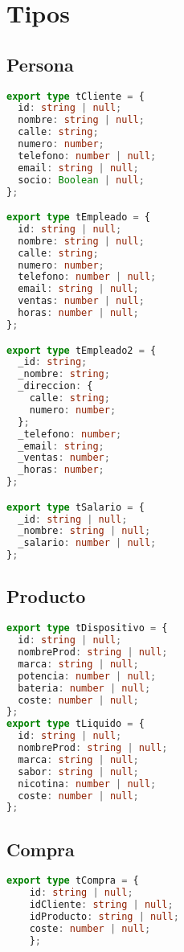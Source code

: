 \documentclass[a4paper]{article} %
\begin{document}
\section{Tipos}
\subsection{Persona}
\begin{lstlisting}[language=Typescript]
export type tCliente = {
  id: string | null;
  nombre: string | null;
  calle: string;
  numero: number;
  telefono: number | null;
  email: string | null;
  socio: Boolean | null;
};

export type tEmpleado = {
  id: string | null;
  nombre: string | null;
  calle: string;
  numero: number;
  telefono: number | null;
  email: string | null;
  ventas: number | null;
  horas: number | null;
};

export type tEmpleado2 = {
  _id: string;
  _nombre: string;
  _direccion: {
    calle: string;
    numero: number;
  };
  _telefono: number;
  _email: string;
  _ventas: number;
  _horas: number;
};

export type tSalario = {
  _id: string | null;
  _nombre: string | null;
  _salario: number | null;
};
\end{lstlisting}
\subsection{Producto}
\begin{lstlisting}[language=Typescript]
export type tDispositivo = {
  id: string | null;
  nombreProd: string | null;
  marca: string | null;
  potencia: number | null;
  bateria: number | null;
  coste: number | null;
};
export type tLiquido = {
  id: string | null;
  nombreProd: string | null;
  marca: string | null;
  sabor: string | null;
  nicotina: number | null;
  coste: number | null;
};
\end{lstlisting}\clearpage
\subsection{Compra}
\begin{lstlisting}[language=Typescript]
export type tCompra = {
	id: string | null;
	idCliente: string | null;
	idProducto: string | null;
	coste: number | null;
	};
\end{lstlisting}\clearpage
\end{document}
